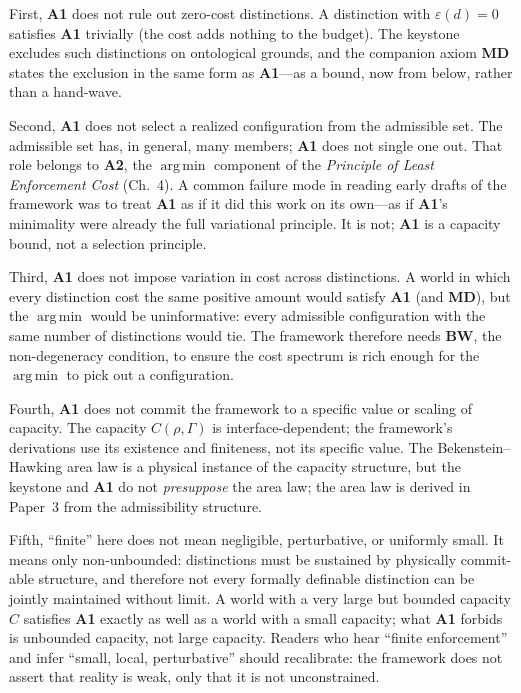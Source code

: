 \documentclass[11pt]{article}
\newcommand{\Aone}{\textbf{A1}}
\newcommand{\argmin}{\mathop{\mathrm{arg\,min}}}
\begin{document}
First, \Aone{} does not rule out zero-cost distinctions. A distinction with $\varepsilon(d) = 0$ satisfies \Aone{} trivially (the cost adds nothing to the budget). The keystone excludes such distinctions on ontological grounds, and the companion axiom \textbf{MD} states the exclusion in the same form as \Aone{}---as a bound, now from below, rather than a hand-wave.

Second, \Aone{} does not select a realized configuration from the admissible set. The admissible set has, in general, many members; \Aone{} does not single one out. That role belongs to \textbf{A2}, the $\argmin$ component of the \emph{Principle of Least Enforcement Cost} (Ch.~4). A common failure mode in reading early drafts of the framework was to treat \Aone{} as if it did this work on its own---as if \Aone{}'s minimality were already the full variational principle. It is not; \Aone{} is a capacity bound, not a selection principle.

Third, \Aone{} does not impose variation in cost across distinctions. A world in which every distinction cost the same positive amount would satisfy \Aone{} (and \textbf{MD}), but the $\argmin$ would be uninformative: every admissible configuration with the same number of distinctions would tie. The framework therefore needs \textbf{BW}, the non-degeneracy condition, to ensure the cost spectrum is rich enough for the $\argmin$ to pick out a configuration.

Fourth, \Aone{} does not commit the framework to a specific value or scaling of capacity. The capacity $C(\rho, \Gamma)$ is interface-dependent; the framework's derivations use its existence and finiteness, not its specific value. The Bekenstein--Hawking area law is a physical instance of the capacity structure, but the keystone and \Aone{} do not \emph{presuppose} the area law; the area law is derived in Paper~3 from the admissibility structure.

Fifth, ``finite'' here does not mean negligible, perturbative, or uniformly small. It means only non-unbounded: distinctions must be sustained by physically commit-able structure, and therefore not every formally definable distinction can be jointly maintained without limit. A world with a very large but bounded capacity $C$ satisfies \Aone{} exactly as well as a world with a small capacity; what \Aone{} forbids is unbounded capacity, not large capacity. Readers who hear ``finite enforcement'' and infer ``small, local, perturbative'' should recalibrate: the framework does not assert that reality is weak, only that it is not unconstrained.
\end{document}
